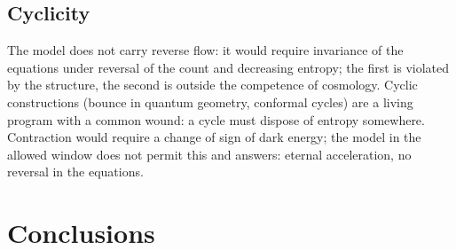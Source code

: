 \documentclass[11pt,a4paper]{article}
\begin{document}
\subsection{Cyclicity}
The model does not carry reverse flow: it would require invariance of the equations under reversal of the count and decreasing entropy; the first is violated by the structure, the second is outside the competence of cosmology. Cyclic constructions (bounce in quantum geometry, conformal cycles) are a living program with a common wound: a cycle must dispose of entropy somewhere. Contraction would require a change of sign of dark energy; the model in the allowed window does not permit this and answers: eternal acceleration, no reversal in the equations.

\section{Conclusions}
\end{document}
